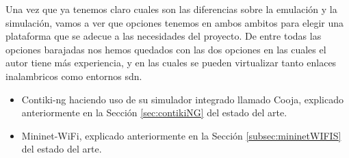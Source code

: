 Una vez que ya tenemos claro cuales son las diferencias sobre la emulación y la simulación, vamos a ver que opciones tenemos en ambos ambitos para elegir una plataforma que se adecue a las necesidades del proyecto. De entre todas las opciones barajadas nos hemos quedados con las dos opciones en las cuales el autor tiene más experiencia, y en las cuales se pueden virtualizar tanto enlaces inalambricos como entornos \gls{sdn}.

\begin{itemize}
    \item Contiki-ng haciendo uso de su simulador integrado llamado Cooja, explicado anteriormente en la Sección \ref{sec:contikiNG} del estado del arte.

    \item Mininet-WiFi, explicado anteriormente en la Sección \ref{subsec:mininetWIFIS} del estado del arte.
\end{itemize}

